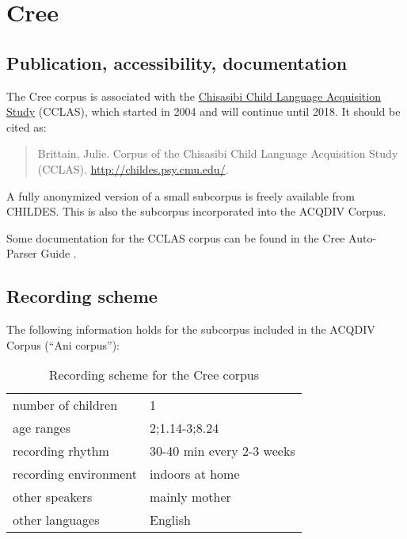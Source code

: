 \documentclass[a4paper, 11pt]{book}
\begin{document}


\section{Cree}
\label{sec:Cree}

\subsection{Publication, accessibility, documentation}

The Cree corpus \citep{Brittain2015a} is associated with the \href{http://www.mun.ca/cclas/}{Chisasibi Child Language Acquisition Study} (CCLAS), which started in 2004 and will continue until 2018. It should be cited as: 

\begin{quote}
Brittain, Julie. Corpus of the Chisasibi Child Language Acquisition Study (CCLAS). \url{http://childes.psy.cmu.edu/}.
\end{quote}

A fully anonymized version of a small subcorpus is freely available from CHILDES. This is also the subcorpus incorporated into the ACQDIV Corpus. 

Some documentation for the CCLAS corpus can be found in the Cree Auto-Parser Guide \citep{Acton2013a}.

\subsection{Recording scheme}

The following information holds for the subcorpus included in the ACQDIV Corpus (“Ani corpus”): 

\begin{table}[ht]
	\centering
	\begin{tabular}{ll}
		\toprule
		number of children 	& 1 \\
		age ranges 			& 2;1.14-3;8.24 \\
		recording rhythm 	& 30-40 min every 2-3 weeks \\
		recording environment & indoors at home \\
		other speakers		& mainly mother \\
		other languages		& English \\
		\bottomrule
	\end{tabular}
	\caption{Recording scheme for the Cree corpus}
	\label{tab:Cree recording scheme}
\end{table}
\end{document}

